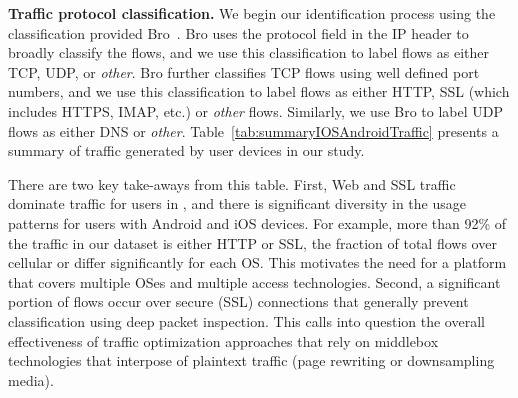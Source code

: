 \noindent\textbf{Traffic protocol classification.} We begin our identification process using the classification provided Bro~\cite{bro}.
Bro uses the protocol field in the IP header to broadly classify the flows, and we use this classification to label flows as either TCP, UDP, or \emph{other}.
Bro further classifies TCP flows using well defined port numbers, and we use this classification to label flows as either HTTP, SSL (which includes HTTPS, IMAP, etc.) or \emph{other} flows.
Similarly, we use Bro to label UDP flows as either DNS or \emph{other}. 
Table~\ref{tab:summaryIOSAndroidTraffic} presents a 
summary of traffic generated by user devices in our study. 

There are two key  
take-aways from this table. First, Web and SSL traffic dominate traffic for users in \mobWild, 
and there is significant diversity in the usage patterns for 
users with Android and iOS devices. For example, more than 92\% of the traffic in our \mobWild dataset is either HTTP or SSL, 
the fraction of total flows over cellular or \wifi differ significantly for each OS. This motivates the need for a platform that covers 
multiple OSes and multiple access technologies. Second, a significant portion of flows occur over secure (SSL) connections 
that generally prevent classification using deep packet inspection. This calls into question 
the overall effectiveness of traffic optimization approaches that rely 
on middlebox technologies that interpose of plaintext traffic (\eg page rewriting or downsampling media).

